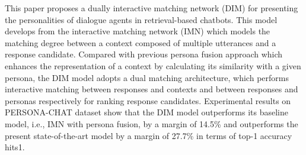 This paper proposes a dually interactive matching network (DIM) for presenting the personalities of dialogue agents in retrieval-based chatbots. This model develops from the  interactive matching network (IMN) which models the matching degree between a context composed of multiple utterances and a response candidate. Compared with previous persona fusion approach which enhances the representation of a context by calculating its similarity with a given persona, the DIM model adopts a dual matching architecture, which performs interactive matching between responses and contexts and between responses and personas respectively for ranking response candidates. Experimental results on PERSONA-CHAT dataset show that the DIM model outperforms its baseline model, i.e., IMN with persona fusion, by a margin of 14.5\% and outperforms the present state-of-the-art model by a margin of 27.7\% in terms of top-1 accuracy hits\@1.